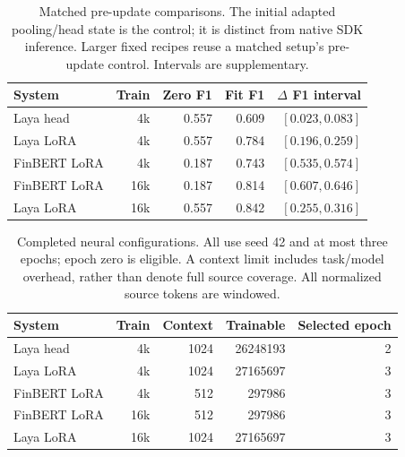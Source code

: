 \begin{table}[!htbp]
\centering
\caption{Matched pre-update comparisons. The initial adapted pooling/head state is the control; it is distinct from native SDK inference. Larger fixed recipes reuse a matched setup's pre-update control. Intervals are supplementary.}
\label{tab:controls}
\small
\setlength{\tabcolsep}{3.5pt}
\begin{tabularx}{\linewidth}{@{}Xrrrr@{}}
\toprule
System & Train & Zero F1 & Fit F1 & $\Delta$ F1 interval\\
\midrule
Laya head & 4k & 0.557 & 0.609 & $[0.023, 0.083]$\\
Laya LoRA & 4k & 0.557 & 0.784 & $[0.196, 0.259]$\\
FinBERT LoRA & 4k & 0.187 & 0.743 & $[0.535, 0.574]$\\
FinBERT LoRA & 16k & 0.187 & 0.814 & $[0.607, 0.646]$\\
Laya LoRA & 16k & 0.557 & 0.842 & $[0.255, 0.316]$\\
\bottomrule
\end{tabularx}
\end{table}

\begin{table}[!htbp]
\centering
\caption{Completed neural configurations. All use seed 42 and at most three epochs; epoch zero is eligible. A context limit includes task/model overhead, rather than denote full source coverage. All normalized source tokens are windowed.}
\label{tab:recipes}
\small
\setlength{\tabcolsep}{3.5pt}
\begin{tabularx}{\linewidth}{@{}Xrrrr@{}}
\toprule
System & Train & Context & Trainable & Selected epoch\\
\midrule
Laya head & 4k & 1024 & 26248193 & 2\\
Laya LoRA & 4k & 1024 & 27165697 & 3\\
FinBERT LoRA & 4k & 512 & 297986 & 3\\
FinBERT LoRA & 16k & 512 & 297986 & 3\\
Laya LoRA & 16k & 1024 & 27165697 & 3\\
\bottomrule
\end{tabularx}
\end{table}

